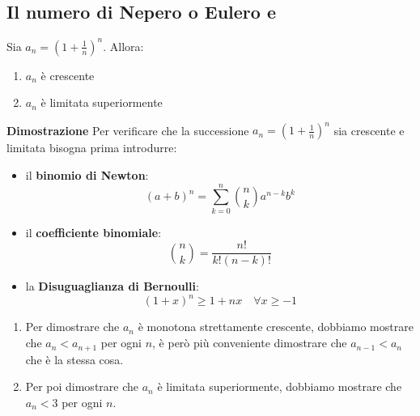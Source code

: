 \documentclass{book}
\begin{document}
\subsection{\textbf{Il numero di Nepero o Eulero e}}
\noindent\begin{minipage}{\textwidth}
    \begin{theorem}
        Sia \(a_n=(1+\frac{1}{n})^n\). Allora:
        \begin{enumerate}
            \item \(a_n\) è crescente
            \item \(a_n\) è limitata superiormente
        \end{enumerate}
        \textbf{Dimostrazione}
        Per verificare che la successione \(a_n=(1+\frac{1}{n})^n\) sia crescente e limitata bisogna prima introdurre:
        \begin{itemize}
            \item  il \textbf{binomio di Newton}:
                  \begin{equation*}
                      (a+b)^n = \sum_{k=0}^{n} \binom{n}{k} a^{n-k}b^k
                  \end{equation*}
            \item il \textbf{coefficiente binomiale}:
                  \begin{equation*}
                      \binom{n}{k} = \frac{n!}{k!(n-k)!}
                  \end{equation*}
            \item la \textbf{Disuguaglianza di Bernoulli}:
                  \begin{equation*}
                      (1+x)^n \geq 1+nx \quad \forall x \geq -1
                  \end{equation*}
        \end{itemize}
        \begin{enumerate}
            \item Per dimostrare che \(a_n\) è monotona strettamente crescente, dobbiamo mostrare che \(a_n < a_{n+1}\) per ogni \(n\), è però più conveniente dimostrare che \(a_{n-1} < a_n\) che è la stessa cosa.
            \item Per poi dimostrare che \(a_n\) è limitata superiormente, dobbiamo mostrare che \(a_n < 3\) per ogni \(n\).
        \end{enumerate}
    \end{theorem}
\end{minipage}
\end{document}
